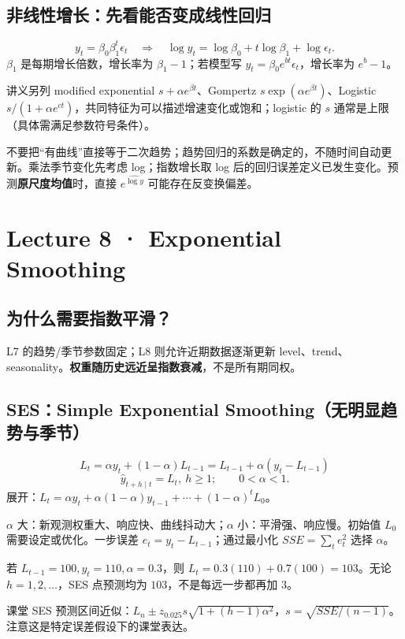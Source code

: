 \documentclass[UTF8,fontset=fandol,10.5pt,a4paper]{ctexart}
\newcommand{\eng}[1]{{\sffamily\color{navy}#1}}
\newcommand{\formula}[1]{\[\boxed{#1}\]}
\begin{document}
\subsection{非线性增长：先看能否变成线性回归}
\begin{keybox}
\[y_t=\beta_0\beta_1^t\epsilon_t\quad\Longrightarrow\quad\log y_t=\log\beta_0+t\log\beta_1+\log\epsilon_t.\]
$\beta_1$ 是每期增长倍数，增长率为 $\beta_1-1$；若模型写 $y_t=\beta_0e^{bt}\epsilon_t$，增长率为 $e^b-1$。
\end{keybox}
讲义另列 \eng{modified exponential} $s+\alpha e^{\beta t}$、\eng{Gompertz} $s\exp(\alpha e^{\beta t})$、\eng{Logistic} $s/(1+\alpha e^{ct})$，共同特征为可以描述增速变化或饱和；logistic 的 $s$ 通常是上限（具体需满足参数符号条件）。
\par\smallskip{}\par\smallskip
\begin{pitbox}
不要把“有曲线”直接等于二次趋势；趋势回归的系数是确定的，不随时间自动更新。乘法季节变化先考虑 log；指数增长取 log 后的回归误差定义已发生变化。预测\textbf{原尺度均值}时，直接 $e^{\widehat{\log y}}$ 可能存在反变换偏差。
\end{pitbox}
\clearpage
\section{Lecture 8 · Exponential Smoothing}
\subsection{为什么需要指数平滑？}
L7 的趋势/季节参数固定；L8 则允许近期数据逐渐更新 \eng{level}、\eng{trend}、\eng{seasonality}。\textbf{权重随历史远近呈指数衰减}，不是所有期同权。
\subsection{SES：Simple Exponential Smoothing（无明显趋势与季节）}
\begin{keybox}
\formula{L_t=\alpha y_t+(1-\alpha)L_{t-1}=L_{t-1}+\alpha(y_t-L_{t-1})}
\[\hat y_{t+h\mid t}=L_t,\ h\ge1;\qquad 0<\alpha<1.\]
展开：$L_t=\alpha y_t+\alpha(1-\alpha)y_{t-1}+\cdots+(1-\alpha)^tL_0$。
\end{keybox}
$\alpha$ 大：新观测权重大、响应快、曲线抖动大；$\alpha$ 小：平滑强、响应慢。初始值 $L_0$ 需要设定或优化。一步误差 $e_t=y_t-L_{t-1}$；通过最小化 $SSE=\sum_t e_t^2$ 选择 $\alpha$。
\begin{exam}
若 $L_{t-1}=100,y_t=110,\alpha=0.3$，则 $L_t=0.3(110)+0.7(100)=103$。无论 $h=1,2,\ldots$，SES 点预测均为 $103$，不是每远一步都再加 3。
\end{exam}
课堂 SES 预测区间近似：$L_n\pm z_{0.025}s\sqrt{1+(h-1)\alpha^2}$，$s=\sqrt{SSE/(n-1)}$。注意这是特定误差假设下的课堂表达。
\par\smallskip{}\par\smallskip
\end{document}
